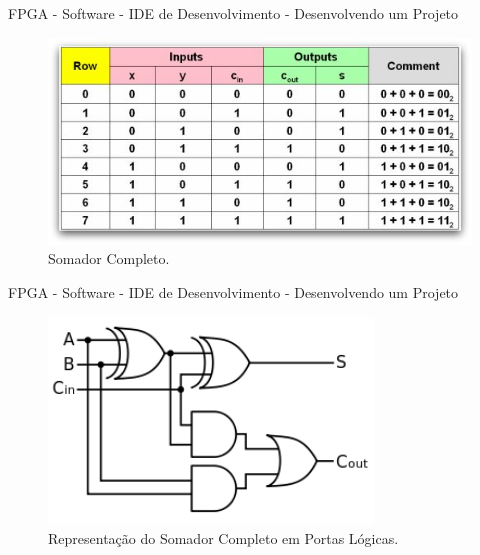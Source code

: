 \documentclass[aspectratio=169]{beamer}
\begin{document}
	\begin{frame}{FPGA - Software - IDE de Desenvolvimento - Desenvolvendo um Projeto }
		\begin{figure}[p]
			\centering
			\includegraphics[width=1\textwidth]{img/fpga/adder-table.jpg}
			\caption{Somador Completo.}
			\label{fig:somador_completo}
		\end{figure}
	\end{frame}
	
	\begin{frame}{FPGA - Software - IDE de Desenvolvimento - Desenvolvendo um Projeto }
		\begin{figure}[p]
			\centering
			\includegraphics[width=0.77\textwidth]{img/fpga/adder.png}
			\caption{Representação do Somador Completo em Portas Lógicas.}
			\label{fig:somador_completo_pl}
		\end{figure}
	\end{frame}
	
\end{document}
